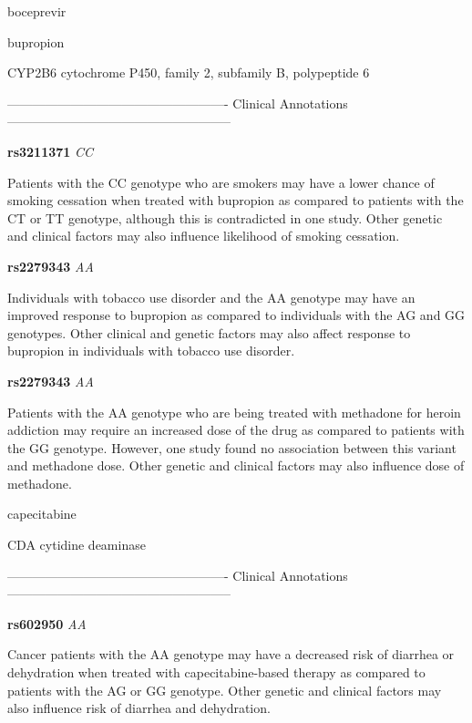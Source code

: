 \documentclass{resume} %
\begin{document}
\begin{rSection}{ boceprevir }
\end{rSection}\begin{rSection}{ bupropion }
\item[]

\begin{rSubsection}{ CYP2B6 }{ cytochrome P450, family 2, subfamily B, polypeptide 6 }{}{}
\item[]

\item[] ---------------------------------------------------- Clinical Annotations -----------------------------------------------------\newline
\item \textbf{ rs3211371 } \textit{ CC }
\item[] Patients with the CC genotype who are smokers may have a lower chance of smoking cessation when treated with bupropion as compared to patients with the CT or TT genotype, although this is contradicted in one study. Other genetic and clinical factors may also influence likelihood of smoking cessation.\item \textbf{ rs2279343 } \textit{ AA }
\item[] Individuals with tobacco use disorder and the AA genotype may have an improved response to bupropion as compared to individuals with the AG and GG genotypes. Other clinical and genetic factors may also affect response to bupropion in individuals with tobacco use disorder. \item \textbf{ rs2279343 } \textit{ AA }
\item[] Patients with the AA genotype who are being treated with methadone for heroin addiction may require an increased dose of the drug as compared to patients with the GG genotype. However, one study found no association between this variant and methadone dose. Other genetic and clinical factors may also influence dose of methadone.
\end{rSubsection}

\end{rSection}\begin{rSection}{ capecitabine }
\item[]

\begin{rSubsection}{ CDA }{ cytidine deaminase }{}{}
\item[]

\item[] ---------------------------------------------------- Clinical Annotations -----------------------------------------------------\newline
\item \textbf{ rs602950 } \textit{ AA }
\item[] Cancer patients with the AA genotype may have a decreased risk of diarrhea or dehydration when treated with capecitabine-based therapy as compared to patients with the AG or GG genotype. Other genetic and clinical factors may also influence risk of diarrhea and dehydration.
\end{rSubsection}


\end{rSection}
\end{document}

